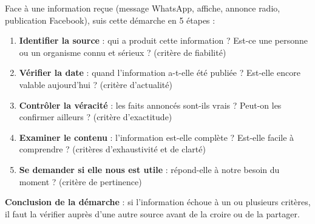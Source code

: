 \documentclass[11pt]{article}
\begin{document}
\begin{methode}
Face à une information reçue (message WhatsApp, affiche, annonce radio, publication Facebook), suis cette démarche en 5 étapes :
\begin{enumerate}
\item \textbf{Identifier la source} : qui a produit cette information ? Est-ce une personne ou un organisme connu et sérieux ? (critère de fiabilité)
\item \textbf{Vérifier la date} : quand l'information a-t-elle été publiée ? Est-elle encore valable aujourd'hui ? (critère d'actualité)
\item \textbf{Contrôler la véracité} : les faits annoncés sont-ils vrais ? Peut-on les confirmer ailleurs ? (critère d'exactitude)
\item \textbf{Examiner le contenu} : l'information est-elle complète ? Est-elle facile à comprendre ? (critères d'exhaustivité et de clarté)
\item \textbf{Se demander si elle nous est utile} : répond-elle à notre besoin du moment ? (critère de pertinence)
\end{enumerate}
\textbf{Conclusion de la démarche} : si l'information échoue à un ou plusieurs critères, il faut la vérifier auprès d'une autre source avant de la croire ou de la partager.
\end{methode}
\end{document}

